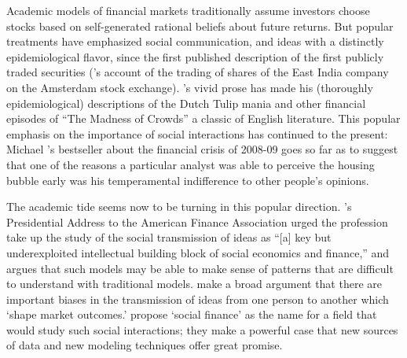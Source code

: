 Academic models of financial markets traditionally assume investors choose stocks based on self-generated rational beliefs about future returns.  But popular treatments have emphasized social communication, and ideas with a distinctly epidemiological flavor, since the first published description of  the first publicly traded securities (\cite{vegaConfusion}'s account of the trading of shares of the East India company on the Amsterdam stock exchange).  \cite{mackay1850memoirs}'s vivid prose has made his (thoroughly epidemiological) descriptions of the Dutch Tulip mania and other financial episodes of ``The Madness of Crowds'' a classic of English literature.  This popular emphasis on the importance of social interactions has continued to the present: Michael \cite{lewis2011big}'s bestseller about the financial crisis of 2008-09 goes so far as to suggest that one of the reasons a particular analyst was able to perceive the housing bubble early was his temperamental indifference to other people's opinions.


The academic tide seems now to be turning in this popular direction. \cite{hirshleifer2020presidential}'s Presidential Address to the American Finance Association urged the profession take up the study of the social transmission of ideas as ``[a] key but underexploited intellectual building block of social economics and finance,'' and argues that such models may be able to make sense of patterns that are difficult to understand with traditional models.  \cite{akccay2021social} make a broad argument that there are important biases in the transmission of ideas from one person to another which `shape market outcomes.' \cite{kuchler2021social} propose `social finance' as the name for a field that would study such social interactions; they make a powerful case that new sources of data and new modeling techniques offer great promise.

